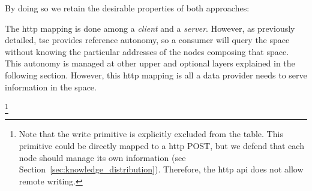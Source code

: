 %
%

By doing so we retain the desirable properties of both approaches:




















The \acs{http} mapping is done among a \textit{client} and a \textit{server}.
However, as previously detailed, \ac{tsc} provides reference autonomy, so a consumer will query the space without knowing the particular addresses of the nodes composing that space.
This autonomy is managed at other upper and optional layers explained in the following section.
However, this \acs{http} mapping is all a data provider needs to serve information in the space.


\footnote{
  Note that the write primitive is explicitly excluded from the table.
  This primitive could be directly mapped to a \acs{http} POST,
  but we defend that each node should manage its own information
  (see Section~\ref{sec:knowledge_distribution}).
  Therefore, the \acs{http} \acs{api} does not allow remote writing.
}